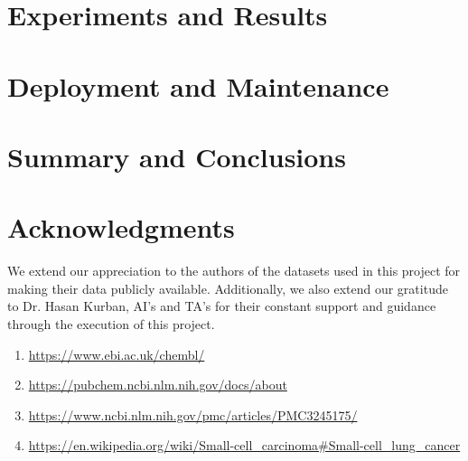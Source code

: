 \documentclass[fleqn,10pt]{SelfArx} %
\begin{document}
\section{Experiments and Results}


\bigskip
\bigskip

\section{Deployment and Maintenance}


\bigskip
\bigskip

\section{Summary and Conclusions}
\bigskip
\bigskip
\bigskip


\section*{Acknowledgments} %
We extend our appreciation to the authors of the datasets used in this project for making their data publicly available. Additionally, we also extend our gratitude to Dr. Hasan Kurban, AI's and TA's for their constant support and guidance through the execution of this project. 



\begin{enumerate}
  \item \href{https://www.ebi.ac.uk/chembl/}{https://www.ebi.ac.uk/chembl/}
  \item \href{https://pubchem.ncbi.nlm.nih.gov/docs/about}{https://pubchem.ncbi.nlm.nih.gov/docs/about}
  \item \href{https://www.ncbi.nlm.nih.gov/pmc/articles/PMC3245175/}{https://www.ncbi.nlm.nih.gov/pmc/articles/PMC3245175/}
  \item \href{https://en.wikipedia.org/wiki/Small-cell_carcinoma#Small-cell_lung_cancer}{https://en.wikipedia.org/wiki/Small-cell_carcinoma#Small-cell_lung_cancer}
\end{enumerate}
\end{document}
